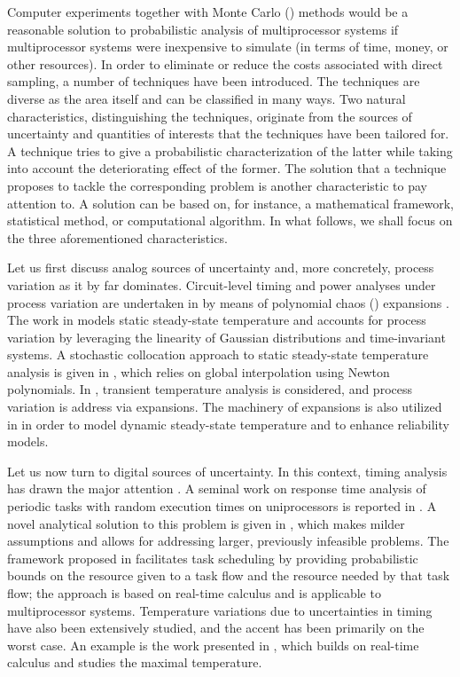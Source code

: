 Computer experiments together with Monte Carlo () methods would be a
reasonable solution to probabilistic analysis of multiprocessor systems if
multiprocessor systems were inexpensive to simulate (in terms of time, money, or
other resources). In order to eliminate or reduce the costs associated with
direct sampling, a number of techniques have been introduced. The techniques are
diverse as the area itself and can be classified in many ways. Two natural
characteristics, distinguishing the techniques, originate from the sources of
uncertainty and quantities of interests that the techniques have been tailored
for. A technique tries to give a probabilistic characterization of the latter
while taking into account the deteriorating effect of the former. The solution
that a technique proposes to tackle the corresponding problem is another
characteristic to pay attention to. A solution can be based on, for instance, a
mathematical framework, statistical method, or computational algorithm. In what
follows, we shall focus on the three aforementioned characteristics.

Let us first discuss analog sources of uncertainty and, more concretely, process
variation as it by far dominates. Circuit-level timing and power analyses under
process variation are undertaken in \cite{bhardwaj2008} by means of polynomial
chaos () expansions \cite{xiu2010}. The work in \cite{juan2012} models
static steady-state temperature and accounts for process variation by leveraging
the linearity of Gaussian distributions and time-invariant systems. A stochastic
collocation \cite{xiu2010} approach to static steady-state temperature analysis
is given in \cite{lee2013}, which relies on global interpolation using Newton
polynomials. In \cite{ukhov2014}, transient temperature analysis is considered,
and process variation is address via  expansions. The machinery of
 expansions is also utilized in \cite{ukhov2015} in order to model
dynamic steady-state temperature and to enhance reliability models.

Let us now turn to digital sources of uncertainty. In this context, timing
analysis has drawn the major attention \cite{quinton2012}. A seminal work on
response time analysis of periodic tasks with random execution times on
uniprocessors is reported in \cite{diaz2002}. A novel analytical solution to
this problem is given in \cite{tanasa2015}, which makes milder assumptions and
allows for addressing larger, previously infeasible problems. The framework
proposed in \cite{santinelli2011} facilitates task scheduling by providing
probabilistic bounds on the resource given to a task flow and the resource
needed by that task flow; the approach is based on real-time calculus and is
applicable to multiprocessor systems. Temperature variations due to
uncertainties in timing have also been extensively studied, and the accent has
been primarily on the worst case. An example is the work presented in
\cite{yang2013}, which builds on real-time calculus and studies the maximal
temperature.

